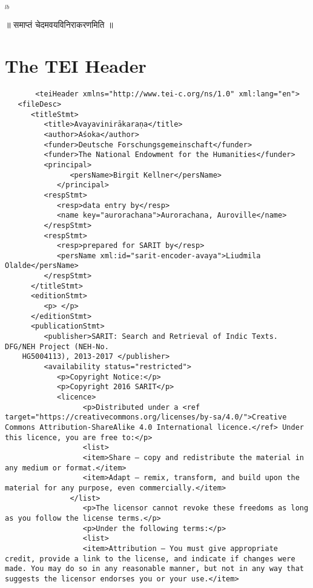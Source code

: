 \documentclass[article,12pt,a4paper]{memoir}%
\begin{document}
	  
	  {\tiny $_{lb}$}
		
		\pstart
		\begin{center}
	      ॥ समाप्तं चेदमवयविनिराकरणमिति ॥
		\end{center}
		\pend
		
	      
	    
	    \endnumbering%
	    
     \backmatter 
	 \chapter{The TEI Header}
	 \begin{verbatim}
       <teiHeader xmlns="http://www.tei-c.org/ns/1.0" xml:lang="en">
   <fileDesc>
      <titleStmt>
         <title>Avayavinirākaraṇa</title>
         <author>Aśoka</author>
         <funder>Deutsche Forschungsgemeinschaft</funder>
         <funder>The National Endowment for the Humanities</funder>
         <principal>
	           <persName>Birgit Kellner</persName>
	        </principal>
         <respStmt>
            <resp>data entry by</resp>
            <name key="aurorachana">Aurorachana, Auroville</name>
         </respStmt>
         <respStmt>
            <resp>prepared for SARIT by</resp>
            <persName xml:id="sarit-encoder-avaya">Liudmila Olalde</persName>
         </respStmt>
      </titleStmt>
      <editionStmt>
         <p> </p>
      </editionStmt>
      <publicationStmt>
         <publisher>SARIT: Search and Retrieval of Indic Texts. DFG/NEH Project (NEH-No.
	HG5004113), 2013-2017 </publisher>
         <availability status="restricted">
            <p>Copyright Notice:</p>
            <p>Copyright 2016 SARIT</p>
            <licence> 
	              <p>Distributed under a <ref target="https://creativecommons.org/licenses/by-sa/4.0/">Creative Commons Attribution-ShareAlike 4.0 International licence.</ref> Under this licence, you are free to:</p>
	              <list>
                  <item>Share — copy and redistribute the material in any medium or format.</item>
                  <item>Adapt — remix, transform, and build upon the material for any purpose, even commercially.</item>
               </list>
	              <p>The licensor cannot revoke these freedoms as long as you follow the license terms.</p>
	              <p>Under the following terms:</p>
	              <list>
                  <item>Attribution — You must give appropriate credit, provide a link to the license, and indicate if changes were made. You may do so in any reasonable manner, but not in any way that suggests the licensor endorses you or your use.</item>

\end{verbatim}
\end{document}
